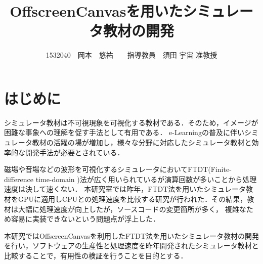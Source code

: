 \documentclass[twocolumn,10pt,a4j]{jsarticle}
\title{OffscreenCanvasを用いたシミュレータ教材の開発}
\author{1532040　岡本　悠祐　　指導教員　須田 宇宙 准教授}
\date{}
\begin{document}
\maketitle
\section{はじめに}
シミュレータ教材は不可視現象を可視化する教材である．そのため，イメージが困難な事象への理解を促す手法として有用である．
e-Learningの普及に伴いシミュレータ教材の活躍の場が増加し，様々な分野に対応したシミュレータ教材と効率的な開発手法が必要とされている．

磁場や音場などの波形を可視化するシミュレータにおいてFTDT(Finite-difference time-domain )法が広く用いられているが演算回数が多いことから処理速度は決して速くない．
本研究室では昨年，FTDT法を用いたシミュレータ教材をGPUに適用しCPUとの処理速度を比較する研究が行われた．その結果，教材は大幅に処理速度が向上したが，ソースコードの変更箇所が多く，
複雑なため容易に実装できないという問題点が浮上した．


本研究ではOffscreenCanvasを利用したFTDT法を用いたシミュレータ教材の開発を行い，ソフトウェアの生産性と処理速度を昨年開発されたシミュレータ教材と比較することで，有用性の検証を行うことを目的とする．

\end{document}
